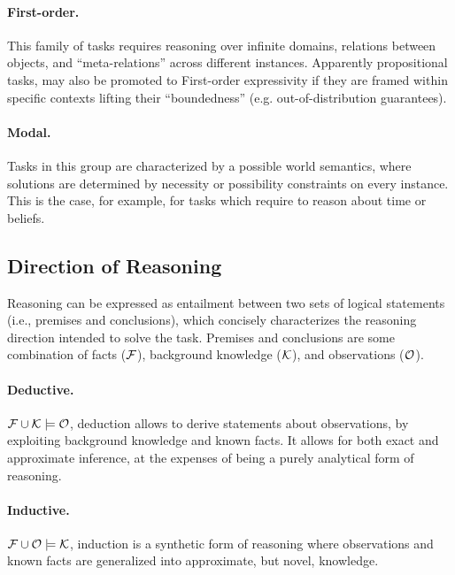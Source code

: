 \paragraph{First-order.} This family of tasks requires reasoning over infinite domains, relations between objects, and ``meta-relations'' across different instances. 
Apparently propositional tasks, may also be promoted to First-order expressivity if they are framed within specific contexts lifting their ``boundedness'' (e.g. out-of-distribution guarantees).

\paragraph{Modal.} Tasks in this group are characterized by a possible world semantics, where solutions are determined by necessity or possibility constraints on every instance. This is the case, for example, for tasks which require to reason about time or beliefs.

\subsection{Direction of Reasoning}
Reasoning can be expressed as entailment between two sets of logical statements (i.e., premises and conclusions), which concisely characterizes the reasoning direction intended to solve the task. Premises and conclusions are some combination of facts (${\mathcal{F}}$), background knowledge (${\mathcal{K}}$), and observations (${\mathcal{O}}$).

\paragraph{Deductive.} ${\mathcal{F}} \cup {\mathcal{K}} \models {\mathcal{O}}$, deduction allows to derive statements about observations, by exploiting background knowledge and known facts. It allows for both exact and approximate inference, at the expenses of being a purely analytical form of reasoning. %

\paragraph{Inductive.} ${\mathcal{F}} \cup {\mathcal{O}} \models {\mathcal{K}}$, induction is a synthetic form of reasoning where observations and known facts are generalized into approximate, but novel, knowledge. %

